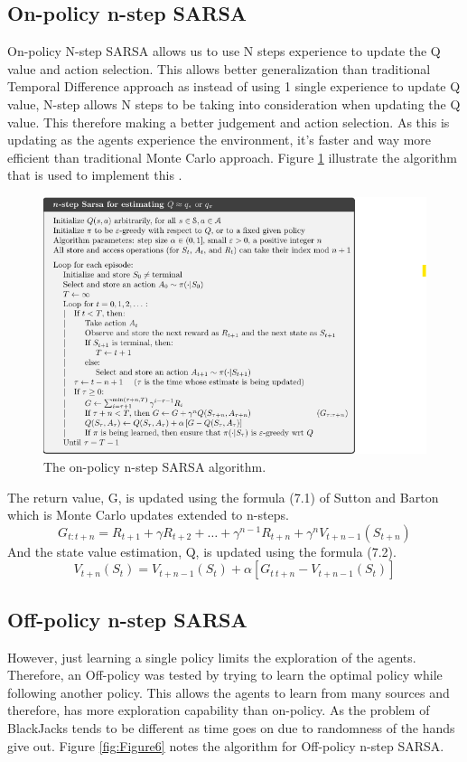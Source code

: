 \documentclass{article}
\begin{document}
\subsection{On-policy n-step SARSA}
On-policy N-step SARSA allows us to use N steps experience to update the Q value
and action selection. This allows better generalization than traditional
Temporal Difference approach as instead of using 1 single experience to update Q
value, N-step allows N steps to be taking into consideration when updating the Q
value. This therefore making a better judgement and action selection. As this is
updating as the agents experience the environment, it's faster and way more
efficient than traditional Monte Carlo approach. Figure \ref{fig:Figure1} illustrate the
algorithm that is used to implement this \citep{sutton_barton}.
\begin{figure}[!ht]
	\centering
	\includegraphics[scale=0.65]{./images/Figure 1.png}
	\caption{The on-policy n-step SARSA algorithm.}
	\label{fig:Figure1}
\end{figure}
The return value, G, is updated using the formula (7.1) of Sutton and Barton
\citep{sutton_barton} which is Monte Carlo updates extended to n-steps.
\[
	G_{t:t+n}=R_{t+1}+\gamma R_{t+2} + \dots +
	\gamma^{n-1}R_{t+n}+\gamma^nV_{t+n-1}(S_{t+n})
\]
And the state value estimation, Q, is updated using the formula (7.2).
\[
	V_{t+n}(S_t) = V_{t+n-1}(S_t)+\alpha[G_{t\:t+n} -
		V_{t+n-1}(S_t)]
\]

\subsection{Off-policy n-step SARSA}
However, just learning a single policy limits the exploration of the agents.
Therefore, an Off-policy was tested by trying to learn the optimal policy while
following another policy. This allows the agents to learn from many sources and
therefore, has more exploration capability than on-policy. As the problem of
BlackJacks tends to be different as time goes on due to randomness of the hands
give out. Figure \ref{fig:Figure6} notes the algorithm for Off-policy n-step SARSA.
\end{document}
